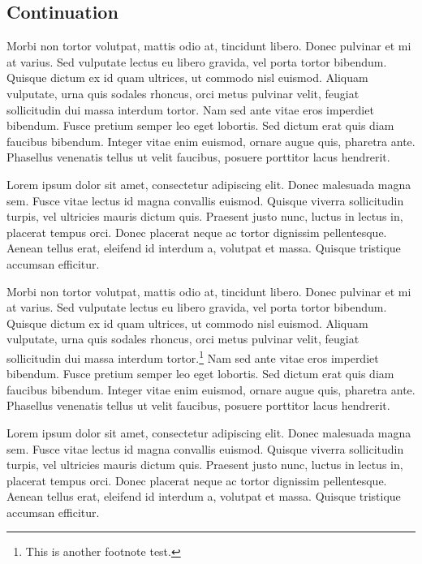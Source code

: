 \documentclass[b5paper,twoside,openright]{scrbook}
\let\cite=\autocite
\begin{document}
\subsection{Continuation}
Morbi non tortor volutpat, mattis odio at, tincidunt libero.
Donec pulvinar et mi at varius.
Sed vulputate lectus eu libero gravida, vel porta tortor bibendum.
Quisque dictum ex id quam ultrices, ut commodo nisl euismod.
Aliquam vulputate, urna quis sodales rhoncus, orci metus pulvinar velit, feugiat sollicitudin dui massa interdum tortor.
Nam sed ante vitae eros imperdiet bibendum.
Fusce pretium semper leo eget lobortis.
Sed dictum erat quis diam faucibus bibendum.
Integer vitae enim euismod, ornare augue quis, pharetra ante.
Phasellus venenatis tellus ut velit faucibus, posuere porttitor lacus hendrerit.

Lorem ipsum dolor sit amet, consectetur adipiscing elit.\cite{Test1}\cite{Test2}
Donec malesuada magna sem.
Fusce vitae lectus id magna convallis euismod.
Quisque viverra sollicitudin turpis, vel ultricies mauris dictum quis.
Praesent justo nunc, luctus in lectus in, placerat tempus orci.
Donec placerat neque ac tortor dignissim pellentesque.
Aenean tellus erat, eleifend id interdum a, volutpat et massa.
Quisque tristique accumsan efficitur.

Morbi non tortor volutpat, mattis odio at, tincidunt libero.
Donec pulvinar et mi at varius.
Sed vulputate lectus eu libero gravida, vel porta tortor bibendum.
Quisque dictum ex id quam ultrices, ut commodo nisl euismod.
Aliquam vulputate, urna quis sodales rhoncus, orci metus pulvinar velit, feugiat sollicitudin dui massa interdum tortor.\footnote{This is another footnote test.}%
Nam sed ante vitae eros imperdiet bibendum. 
Fusce pretium semper leo eget lobortis.
Sed dictum erat quis diam faucibus bibendum.
Integer vitae enim euismod, ornare augue quis, pharetra ante.
Phasellus venenatis tellus ut velit faucibus, posuere porttitor lacus hendrerit.

Lorem ipsum dolor sit amet, consectetur adipiscing elit.
Donec malesuada magna sem.
Fusce vitae lectus id magna convallis euismod.
Quisque viverra sollicitudin turpis, vel ultricies mauris dictum quis.
Praesent justo nunc, luctus in lectus in, placerat tempus orci.
Donec placerat neque ac tortor dignissim pellentesque.
Aenean tellus erat, eleifend id interdum a, volutpat et massa.
Quisque tristique accumsan efficitur.
\end{document}
